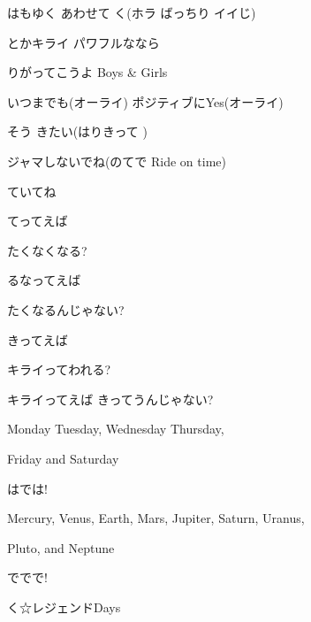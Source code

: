 \documentclass[14pt]{ltjsarticle}
\begin{document}
{  はもゆく あわせて く(ホラ ばっちり イイじ)
  \jisho{}

  とかキライ パワフルななら
  \jisho{}

  りがってこうよ Boys \& Girls
  \jisho{}

  いつまでも(オーライ) ポジティブにYes(オーライ)
  \jisho{}

  そう きたい(はりきって )
  \jisho{}

  ジャマしないでね(のてで Ride on time)
  \jisho{}

  ていてね
  \jisho{}

\item
  てってえば
  \jisho{}

  たくなくなる?
  \jisho{}

  るなってえば
  \jisho{}

  たくなるんじゃない?
  \jisho{}

  きってえば
  \jisho{}

  キライってわれる?
  \jisho{}

  キライってえば きってうんじゃない?
  \jisho{}

\item
  \jisho{}

  Monday Tuesday, Wednesday Thursday,
  \jisho{}

  Friday and Saturday
  \jisho{}

  はでは!
  \jisho{}

  \jisho{}

  Mercury, Venus, Earth, Mars, Jupiter, Saturn, Uranus,
  \jisho{}

  Pluto, and Neptune
  \jisho{}

  ででで!
  \jisho{}

  く☆レジェンドDays
  \jisho{}

}
\end{document}
